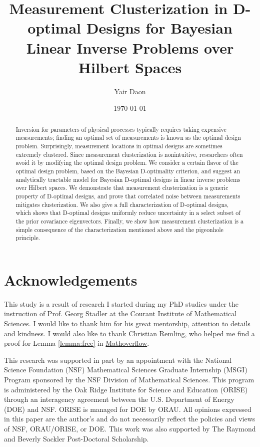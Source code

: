 \documentclass{amsart}
\title{Measurement Clusterization in D-optimal Designs for Bayesian Linear
  Inverse Problems over Hilbert Spaces}
\author{Yair Daon}
\date{\today}
\begin{document}
\begin{abstract}
  Inversion for parameters of physical processes typically requires
  taking expensive measurements; finding an optimal set of
  measurements is known as the optimal design problem. Surprisingly,
  measurement locations in optimal designs are sometimes extremely
  clustered. Since measurement clusterization is nonintuitive,
  researchers often avoid it by modifying the optimal design
  problem. We consider a certain flavor of the optimal design problem,
  based on the Bayesian D-optimality criterion, and suggest an
  analytically tractable model for Bayesian D-optimal designs in
  linear inverse problems over Hilbert spaces. We demonstrate that
  measurement clusterization is a generic property of D-optimal
  designs, and prove that correlated noise between measurements
  mitigates clusterization. We also give a full characterization of
  D-optimal designs, which shows that D-optimal designs uniformly
  reduce uncertainty in a select subset of the prior covariance
  eigenvectors. Finally, we show how measurement clusterization is a
  simple consequence of the characterization mentioned above and the
  pigeonhole principle.
\end{abstract}
\maketitle










\section{Acknowledgements}
This study is a result of research I started during my PhD studies
under the instruction of Prof. Georg Stadler at the Courant Institute
of Mathematical Sciences. I would like to thank him for his great
mentorship, attention to details and kindness. I would also like to
thank Christian Remling, who helped me find a proof for Lemma
\ref{lemma:free} in
\href{https://mathoverflow.net/questions/280168/redistribute-diagonal-entries-of-a-matrix/280203#280203c}{Mathoverflow}.

This research was supported in part by an appointment with the
National Science Foundation (NSF) Mathematical Sciences Graduate
Internship (MSGI) Program sponsored by the NSF Division of
Mathematical Sciences. This program is administered by the Oak Ridge
Institute for Science and Education (ORISE) through an interagency
agreement between the U.S. Department of Energy (DOE) and NSF. ORISE
is managed for DOE by ORAU. All opinions expressed in this paper are
the author's and do not necessarily reflect the policies and views of
NSF, ORAU/ORISE, or DOE. This work was also supported by The Raymond
and Beverly Sackler Post-Doctoral Scholarship.



%


\end{document}
